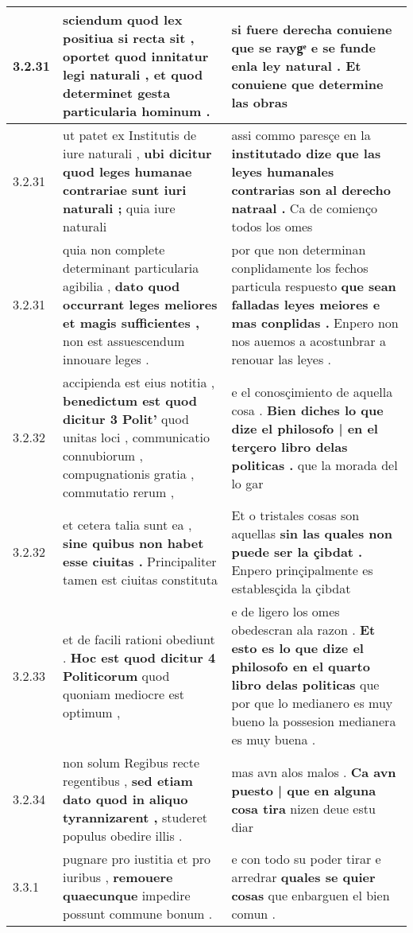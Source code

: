 \begin{tabular}{|p{1cm}|p{6.5cm}|p{6.5cm}|}
3.2.31 & sciendum quod lex positiua si recta sit , \textbf{ oportet quod innitatur legi naturali , } et quod determinet gesta particularia hominum . & si fuere derecha conuiene que se raygͤ \textbf{ e se funde enla ley natural . } Et conuiene que determine las obras \\\hline
3.2.31 & ut patet ex Institutis de iure naturali , \textbf{ ubi dicitur quod leges humanae contrariae sunt iuri naturali ; } quia iure naturali & assi commo paresçe en la \textbf{ institutado dize que las leyes humanales contrarias son al derecho natraal . } Ca de comienço todos los omes \\\hline
3.2.31 & quia non complete determinant particularia agibilia , \textbf{ dato quod occurrant leges meliores et magis sufficientes , } non est assuescendum innouare leges . & por que non determinan conplidamente los fechos particula respuesto \textbf{ que sean falladas leyes meiores e mas conplidas . } Enpero non nos auemos a acostunbrar a renouar las leyes . \\\hline
3.2.32 & accipienda est eius notitia , \textbf{ benedictum est quod dicitur 3 Polit’ } quod unitas loci , communicatio connubiorum , compugnationis gratia , commutatio rerum , & e el conosçimiento de aquella cosa . \textbf{ Bien diches lo que dize el philosofo | en el terçero libro delas politicas . } que la morada del lo gar \\\hline
3.2.32 & et cetera talia sunt ea , \textbf{ sine quibus non habet esse ciuitas . } Principaliter tamen est ciuitas constituta & Et o tristales cosas son aquellas \textbf{ sin las quales non puede ser la çibdat . } Enpero prinçipalmente es establesçida la çibdat \\\hline
3.2.33 & et de facili rationi obediunt . \textbf{ Hoc est quod dicitur 4 Politicorum } quod quoniam mediocre est optimum , & e de ligero los omes obedescran ala razon . \textbf{ Et esto es lo que dize el philosofo en el quarto libro delas politicas } que por que lo medianero es muy bueno la possesion medianera es muy buena . \\\hline
3.2.34 & non solum Regibus recte regentibus , \textbf{ sed etiam dato quod in aliquo tyrannizarent , } studeret populus obedire illis . & mas avn alos malos . \textbf{ Ca avn puesto | que en alguna cosa tira } nizen deue estu diar \\\hline
3.3.1 & pugnare pro iustitia et pro iuribus , \textbf{ remouere quaecunque } impedire possunt commune bonum . & e con todo su poder tirar e arredrar \textbf{ quales se quier cosas } que enbarguen el bien comun . \\\hline

\end{tabular}

